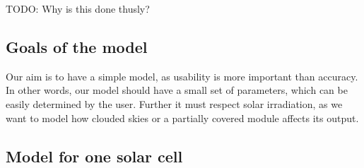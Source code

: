 TODO: Why is this done thusly?


\subsection{Goals of the model}

Our aim is to have a simple model, as usability is more important than accuracy.
In  other words, our model should have a small set of parameters, which  can  be
easily determined by the  user. Further it must respect solar irradiation, as we
want  to  model  how clouded skies or a partially  covered  module  affects  its
output.


\subsection{Model for one solar cell}

